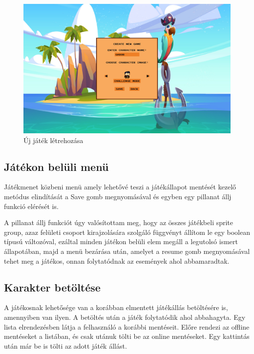 \begin{figure}[H]
    \centering
    \includegraphics[width=15.0truecm]{images/newgame.png}
    \caption{Új játék létrehozása
    \cite{NewGame}}
    \label{fig:Új játék létrehozása}
\end{figure}

\subsection{Játékon belüli menü}

\indent \indent Játékmenet közbeni menü amely lehetővé teszi a játékállapot mentését kezelő metódus elindítását a Save gomb megnyomásával és egyben egy pillanat állj funkció elérését is. 

A pillanat állj funkciót úgy valósítottam meg, hogy az összes játékbeli sprite group, azaz felületi csoport kirajzolására szolgáló függvényt állítom le egy boolean típusú változóval, ezáltal minden játékon belüli elem megáll a legutolsó ismert állapotában, majd a menü bezárása után, amelyet a resume gomb megnyomásával tehet meg a játékos, onnan folytatódnak az események ahol abbamaradtak.


\subsection{Karakter betöltése}
\indent \indent A játékosnak lehetősége van a korábban elmentett játékállás betöltésére is, amennyiben van ilyen. A betöltés után a játék folytatódik ahol abbahagyta. Egy lista elrendezésben látja a felhasználó a korábbi mentéseit. Előre rendezi az offline mentéseket a listában, és csak utánuk tölti be az online mentéseket. Egy kattintás után már be is tölti az adott játék állást.


